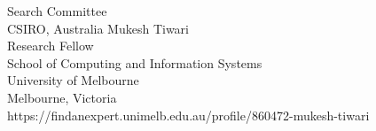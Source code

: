 \documentclass{letter}
\begin{document}
\begin{letter}{Search Committee\\
CSIRO, Australia}
Mukesh Tiwari\\
Research Fellow \\
School of Computing and Information Systems\\
University of Melbourne\\
Melbourne, Victoria\\
https://findanexpert.unimelb.edu.au/profile/860472-mukesh-tiwari\\
\end{letter}
\end{document}
